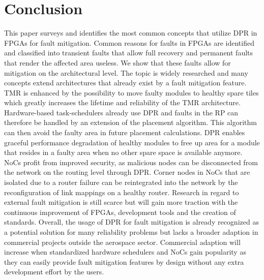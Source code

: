 \section{Conclusion}\label{Conclusion}
This paper surveys and identifies the most common concepts that utilize \gls{DPR} in \glspl{FPGA} for fault mitigation.
Common reasons for faults in \glspl{FPGA} are identified and classified into transient faults that allow full recovery and permanent faults that render the affected area useless. 
We show that these faults allow for mitigation on the architectural level.
The topic is widely researched and many concepts extend architectures that already exist by a fault mitigation feature.
\gls{TMR} is enhanced by the possibility to move faulty modules to healthy spare tiles which greatly increases the lifetime and reliability of the \gls{TMR} architecture.  
Hardware-based task-schedulers already use \gls{DPR} and faults in the \gls{RP} can therefore be handled by an extension of the placement algorithm.
This algorithm can then avoid the faulty area in future placement calculations.
\gls{DPR} enables graceful performance degradation of healthy modules to free up area for a module that resides in a faulty area when no other spare space is available anymore. 
\glspl{NoC} profit from improved security, as malicious nodes can be disconnected from the network on the routing level through \gls{DPR}.
Corner nodes in \glspl{NoC} that are isolated due to a router failure can be reintegrated into the network by the reconfiguration of link mappings on a healthy router. 
Research in regard to external fault mitigation is still scarce but will gain more traction with the continuous improvement of \glspl{FPGA}, development tools and the creation of standards.
Overall, the usage of \gls{DPR} for fault mitigation is already recognized as a potential solution for many reliability problems but lacks a broader adaption in commercial projects outside the aerospace sector.
Commercial adaption will increase when standardized hardware schedulers and \glspl{NoC} gain popularity as they can easily provide fault mitigation features by design without any extra development effort by the users.

